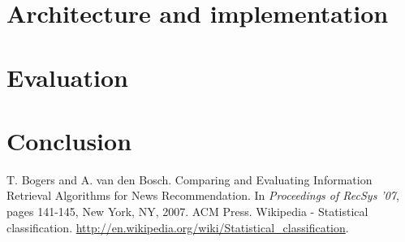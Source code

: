 \documentclass{llncs}
\begin{document}
\section{Architecture and implementation}


\section{Evaluation}

\section{Conclusion}

\begin{thebibliography}{99}
 T. Bogers and A. van den Bosch. Comparing and Evaluating Information Retrieval Algorithms for News Recommendation. In \emph{Proceedings of RecSys '07}, pages 141-145, New York, NY, 2007. ACM Press.  
 Wikipedia - Statistical classification. \url{http://en.wikipedia.org/wiki/Statistical\_classification}.
\end{thebibliography}
\end{document}
